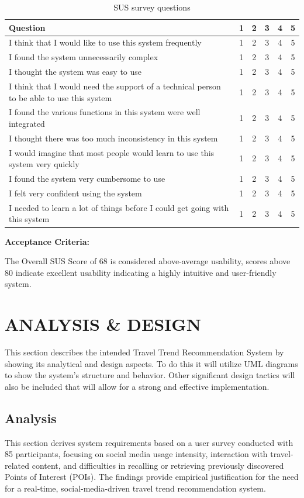 \documentclass[a4paper,12pt]{report}
\begin{document}
\begin{table}[H]
\centering
\caption{SUS survey questions}
\label{sus}
\begin{tabular}{|p{}|c|c|c|c|c|}
\hline
\textbf{Question} & \textbf{1} & \textbf{2} & \textbf{3} & \textbf{4} & \textbf{5} \\ \hline
I think that I would like to use this system frequently & 1 & 2 & 3 & 4 & 5 \\ \hline
I found the system unnecessarily complex & 1 & 2 & 3 & 4 & 5 \\ \hline
I thought the system was easy to use & 1 & 2 & 3 & 4 & 5 \\ \hline
I think that I would need the support of a technical person to be able to use this system & 1 & 2 & 3 & 4 & 5 \\ \hline
I found the various functions in this system were well integrated & 1 & 2 & 3 & 4 & 5 \\ \hline
I thought there was too much inconsistency in this system & 1 & 2 & 3 & 4 & 5 \\ \hline
I would imagine that most people would learn to use this system very quickly & 1 & 2 & 3 & 4 & 5 \\ \hline
I found the system very cumbersome to use & 1 & 2 & 3 & 4 & 5 \\ \hline
I felt very confident using the system & 1 & 2 & 3 & 4 & 5 \\ \hline
I needed to learn a lot of things before I could get going with this system & 1 & 2 & 3 & 4 & 5 \\ \hline
\end{tabular}
\end{table}

\textbf{Acceptance Criteria:}

The Overall SUS Score of 68 is considered above-average usability, scores above 80 indicate excellent usability indicating a highly intuitive and user-friendly system. 

\chapter{ANALYSIS \& DESIGN}
This section describes the intended Travel Trend Recommendation System by showing its analytical and design aspects. To do this it will utilize UML diagrams to show the system’s structure and behavior. Other significant design tactics will also be included that will allow for a strong and effective implementation.

\section{Analysis}
This section derives system requirements based on a user survey conducted with 85 participants, focusing on social media usage intensity, interaction with travel-related content, and difficulties in recalling or retrieving previously discovered Points of Interest (POIs). The findings provide empirical justification for the need for a real-time, social-media-driven travel trend recommendation system.
\end{document}
